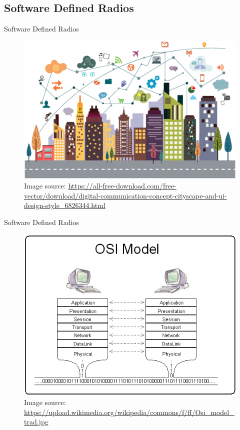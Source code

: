 \documentclass{beamer}
\begin{document}
\subsection{Software Defined Radios}
\begin{frame}{Software Defined Radios}
    \begin{figure}
	\includegraphics[width=0.74\linewidth]{digital.eps}
    \center
        \begingroup
            \fontsize{3pt}{3pt}\selectfont
            \center
            Image source: \url{https://all-free-download.com/free-vector/download/digital-communication-concept-cityscape-and-ui-design-style_6826344.html}
        \endgroup
    \end{figure}
\end{frame}
\begin{frame}{Software Defined Radios}
	\begin{figure}
 		\includegraphics[width=0.65\linewidth]{osi.jpg}
 		\label{fig:osi}
        \center
        \begingroup
            \fontsize{3pt}{3pt}\selectfont
            \center
            Image source: \url{https://upload.wikimedia.org/wikipedia/commons/f/ff/Osi_model_trad.jpg}
        \endgroup
	\end{figure}
    \begin{figure}

    \end{figure}
\end{frame}
\end{document}
